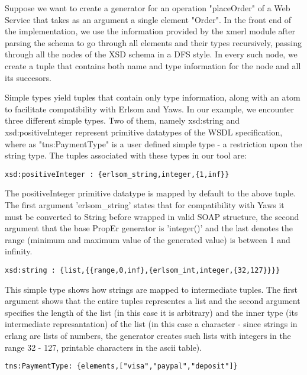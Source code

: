 \documentclass[submission,copyright,a4]{eptcs}
\begin{document}

Suppose we want to create a generator for an operation "placeOrder" of a Web Service that takes as an argument a single element "Order". In the front end of the implementation, we use the information provided by the xmerl module after parsing the schema to go through all elements and their types recursively, passing through all the nodes of the XSD schema in a DFS style. In every such node, we create a tuple that contains both name and type information for the node and all its succesors. 

Simple types yield tuples that contain only type information, along with an atom to facilitate compatibility with Erlsom and Yaws. In our example, we encounter three different simple types. Two of them, namely xsd:string and xsd:positiveInteger represent primitive datatypes of the WSDL specification, where as "tns:PaymentType" is a user defined simple type - a restriction upon the string type. The tuples associated with these types in our tool are:

\begin{lstlisting}
xsd:positiveInteger : {erlsom_string,integer,{1,inf}}
\end{lstlisting}

The positiveInteger primitive datatype is mapped by default to the above tuple. The first argument 'erlsom\_string' states that for compatibility with Yaws it must be converted to String before wrapped in valid SOAP structure, the second argument that the base PropEr generator is 'integer()' and the last denotes the range (minimum and maximum value of the generated value) is between 1 and infinity. 

\begin{lstlisting}
xsd:string : {list,{{range,0,inf},{erlsom_int,integer,{32,127}}}}
\end{lstlisting}

This simple type shows how strings are mapped to intermediate tuples. The first argument shows that the entire tuples representes a list and the second argument specifies the length of the list (in this case it is arbitrary) and the inner type (its intermediate represantation) of the list (in this case a character - since strings in erlang are lists of numbers, the generator creates such lists with integers in the range 32 - 127, printable characters in the ascii table).

\begin{lstlisting}
tns:PaymentType: {elements,["visa","paypal","deposit"]}
\end{lstlisting}
\end{document}
